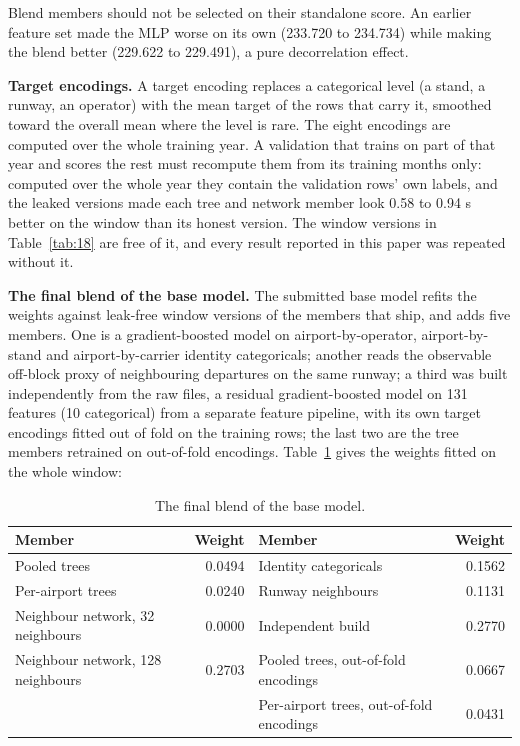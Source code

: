 \documentclass[
  manuscript=article,
  layout=preprint,
  year=2026,
  volume=x,
]{extra/joas}
\begin{document}
Blend members should not be selected on their standalone score. An earlier feature set made the MLP worse on its own (233.720 to 234.734) while making the blend better (229.622 to 229.491), a pure decorrelation effect.

\textbf{Target encodings.} A target encoding replaces a categorical level (a stand, a runway, an operator) with the mean target of the rows that carry it, smoothed toward the overall mean where the level is rare. The eight encodings are computed over the whole training year. A validation that trains on part of that year and scores the rest must recompute them from its training months only: computed over the whole year they contain the validation rows' own labels, and the leaked versions made each tree and network member look 0.58 to 0.94 s better on the window than its honest version. The window versions in Table~\ref{tab:18} are free of it, and every result reported in this paper was repeated without it.

\textbf{The final blend of the base model.} The submitted base model refits the weights against leak-free window versions of the members that ship, and adds five members. One is a gradient-boosted model on airport-by-operator, airport-by-stand and airport-by-carrier identity categoricals; another reads the observable off-block proxy of neighbouring departures on the same runway; a third was built independently from the raw files, a residual gradient-boosted model on 131 features (10 categorical) from a separate feature pipeline, with its own target encodings fitted out of fold on the training rows; the last two are the tree members retrained on out-of-fold encodings. Table~\ref{tab:19} gives the weights fitted on the whole window:

\begin{table}[htbp!]
  \centering
  \small
  \setlength{\tabcolsep}{5pt}\renewcommand{\arraystretch}{1.15}
  \caption{The final blend of the base model.}
  \label{tab:19}
  \begin{tabular*}{\linewidth}{@{\extracolsep{\fill}}lrlr}
  \toprule
  \textbf{Member} & \textbf{Weight} & \textbf{Member} & \textbf{Weight} \\
  \midrule
  Pooled trees & 0.0494 & Identity categoricals & 0.1562 \\
  Per-airport trees & 0.0240 & Runway neighbours & 0.1131 \\
  Neighbour network, 32 neighbours & 0.0000 & Independent build & 0.2770 \\
  Neighbour network, 128 neighbours & 0.2703 & Pooled trees, out-of-fold encodings & 0.0667 \\
   &  & Per-airport trees, out-of-fold encodings & 0.0431 \\
  \bottomrule
  \end{tabular*}
\end{table}
\end{document}
